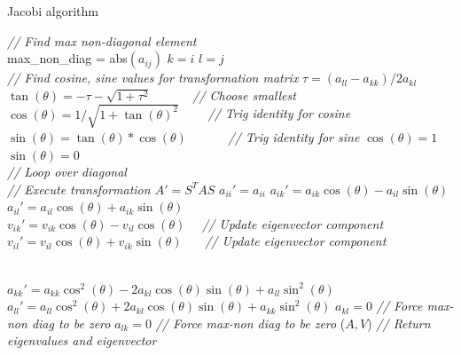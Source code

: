 \documentclass[12pt]{article}
\numberwithin{figure}{section}
\numberwithin{table}{section}
\begin{document}
\begin{algorithm}
\caption{Jacobi algorithm} \label{alg:jacobi}
\begin{algorithmic}[1]
      \State \textit{// Find max non-diagonal element} \\
                  \State max\_non\_diag = abs$(a_{ij})$
                  \State $k=i$
                  \State $l=j$
              \EndIf
          \EndFor
      \EndFor \\

      \State \textit{// Find cosine, sine values for transformation matrix}
          \State $\tau = (a_{ll} - a_{kk})/2a_{kl}$
          \State $\tan(\theta) = -\tau - \sqrt{1 + \tau^2}$ \ \ \ \ \ \ \textit{// Choose smallest}
          \State $\cos(\theta) = 1/\sqrt{1 + \tan(\theta)^2}$ \ \ \ \ \textit{// Trig identity for cosine}
          \State $\sin(\theta) = \tan(\theta)*\cos(\theta)$ \ \ \ \ \ \ \textit{// Trig identity for sine}
      \Else
          \State $\cos(\theta) = 1$
          \State $\sin(\theta) = 0$
      \EndIf \\

      \State \textit{// Loop over diagonal}
       \\
      	  \State \textit{// Execute transformation $A'=S^TAS$}
              \State $a_{ii}'=a_{ii}$
              \State $a_{ik}'=a_{ik}\cos(\theta)-a_{il}\sin(\theta)$
              \State $a_{il}'=a_{il}\cos(\theta)+a_{ik}\sin(\theta)$
          \EndIf \\

          \State $v_{ik}' = v_{ik}\cos(\theta) - v_{il}\cos(\theta)$ \ \ \textit{// Update eigenvector component}
          \State $v_{il}' = v_{il}\cos(\theta) + v_{ik}\sin(\theta)$ \ \ \ \textit{// Update eigenvector component}

      \EndFor \\

      \State $a_{kk}'=a_{kk}\cos^2(\theta)-2a_{kl}\cos(\theta)\sin(\theta)+a_{ll}\sin^2(\theta)$
      \State $a_{ll}'=a_{ll}\cos^2(\theta)+2a_{kl}\cos(\theta)\sin(\theta)+a_{kk}\sin^2(\theta)$
      \State $a_{kl}=0$ \qquad\qquad\qquad \textit{// Force max-non diag to be zero}
      \State $a_{lk}=0$ \qquad\qquad\qquad \textit{// Force max-non diag to be zero}
    \EndWhile
    \State \Return($A, V$) \qquad \textit{// Return eigenvalues and eigenvector}
\EndProcedure
\end{algorithmic}
\end{algorithm}
\end{document}
